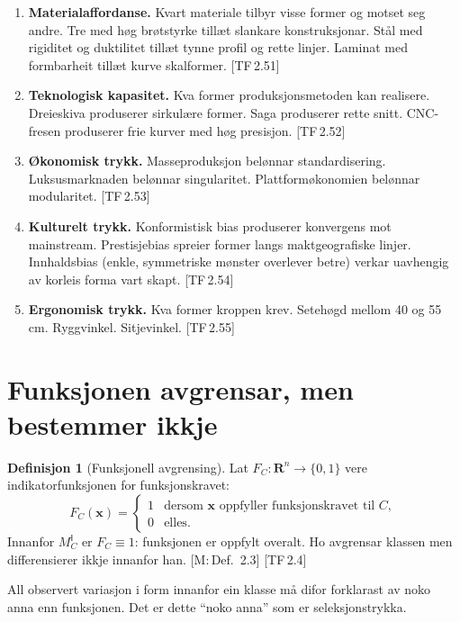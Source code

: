 \documentclass[10pt]{book}
\theoremstyle{definition}
\newtheorem{definisjon}{Definisjon}[chapter]
\theoremstyle{plain}
\theoremstyle{remark}
\newcommand{\MC}{M^{\mathsf{I}}_C}
\providecommand{\Rn}{}
\renewcommand{\Rn}{\mathbf{R}^n}
\newcommand{\TF}[1]{\textnormal{[TF\,#1]}}
\newcommand{\Mref}[1]{\textnormal{[M:\,#1]}}
\begin{document}
\begin{enumerate}[label=\textbf{\arabic*.}]
  \item \textbf{Materialaffordanse.} Kvart materiale tilbyr visse former og motset seg andre. Tre med h\o g br\o tstyrke till\ae t slankare konstruksjonar. St\aa l med rigiditet og duktilitet till\ae t tynne profil og rette linjer. Laminat med formbarheit till\ae t kurve skalformer. \TF{2.51}
  \item \textbf{Teknologisk kapasitet.} Kva former produksjonsmetoden kan realisere. Dreieskiva produserer sirkul\ae re former. Saga produserer rette snitt. CNC-fresen produserer frie kurver med h\o g presisjon. \TF{2.52}
  \item \textbf{\O konomisk trykk.} Masseproduksjon bel\o nnar standardisering. Luksusmarknaden bel\o nnar singularitet. Plattform\o konomien bel\o nnar modularitet. \TF{2.53}
  \item \textbf{Kulturelt trykk.} Konformistisk bias produserer konvergens mot mainstream. Prestisjebias spreier former langs maktgeografiske linjer. Innhaldsbias (enkle, symmetriske m\o nster overlever betre) verkar uavhengig av korleis forma vart skapt. \TF{2.54}
  \item \textbf{Ergonomisk trykk.} Kva former kroppen krev. Seteh\o gd mellom 40 og 55\,cm. Ryggvinkel. Sitjevinkel. \TF{2.55}
\end{enumerate}

\section{Funksjonen avgrensar, men bestemmer ikkje}\label{sec:seleksjon:funksjon}

\begin{definisjon}[Funksjonell avgrensing]\label{def:funkavgr}
Lat $F_C : \Rn \to \{0, 1\}$ vere indikatorfunksjonen for funksjonskravet:
\[
  F_C(\bm{x}) =
  \begin{cases}
    1 & \text{dersom } \bm{x} \text{ oppfyller funksjonskravet til } C, \\
    0 & \text{elles.}
  \end{cases}
\]
Innanfor $\MC$ er $F_C \equiv 1$: funksjonen er oppfylt overalt. Ho avgrensar klassen men differensierer ikkje innanfor han. \Mref{Def.~2.3} \TF{2.4}
\end{definisjon}

All observert variasjon i form innanfor ein klasse m\aa{} difor forklarast av noko anna enn funksjonen. Det er dette ``noko anna'' som er seleksjonstrykka.
\end{document}

